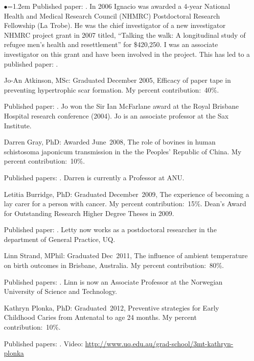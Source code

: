 \documentclass[a4paper,11pt]{article}
\renewcommand{\labelitemi}{$\bullet$}
\begin{document}
\begin{raggedright}
\begin{list}{\labelitemi}{\leftmargin=1.2em}
Published paper: . In 2006 Ignacio was awarded a 4-year National Health and Medical Research Council (NHMRC) Postdoctoral Research Fellowship (La Trobe). He was the chief investigator of a new investigator NHMRC project grant in 2007 titled, ``Talking the walk: A longitudinal study of refugee men's health and resettlement'' for \$420,250. I was an associate investigator on this grant and have been involved in the project. This has led to a published paper: .

\item Jo-An Atkinson, MSc: Graduated December 2005, Efficacy of paper tape in preventing hypertrophic scar formation. My percent contribution:~40\%.

Published paper: . Jo won the Sir Ian McFarlane award at the Royal Brisbane Hospital research conference (2004). Jo is an associate professor at the Sax Institute.

\item Darren Gray, PhD: Awarded June~2008, The role of bovines in human schistosoma japonicum transmission in the the Peoples' Republic of China. My percent contribution:~10\%.

Published papers: . Darren is currently a Professor at ANU.

\item Letitia Burridge, PhD: Graduated December~2009, The experience of becoming a lay carer for a person with cancer. My percent contribution:~15\%. Dean's Award for Outstanding Research Higher Degree Theses in 2009.

Published paper: . Letty now works as a postdoctoral researcher in the department of General Practice, UQ.

\item Linn Strand, MPhil: Graduated Dec~2011, The influence of ambient temperature on birth outcomes in Brisbane, Australia. My percent contribution:~80\%.

Published papers: . Linn is now an Associate Professor at the Norwegian University of Science and Technology.

\item Kathryn Plonka, PhD: Graduated~2012, Preventive strategies for Early Childhood Caries from Antenatal to age 24 months. My percent contribution:~10\%.

Published papers: . Video: \url{http://www.uq.edu.au/grad-school/3mt-kathryn-plonka}


\end{list}
\end{raggedright}
\end{document}
